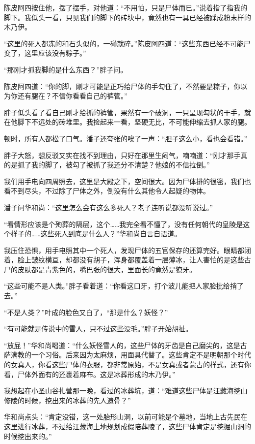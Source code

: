 陈皮阿四按住他，摆了摆手，对他道：“不用怕，只是尸体而已。”说着指了指我的脚下。我低头一看，只见我们的脚下的砖块中，竟然也有一具已经被踩成粉末样的木乃伊。

“这里的死人都冻的和石头似的，一碰就碎。”陈皮阿四道：“这些东西已经不可能尸变了，这里应该没有粽子。”

“那刚才抓我脚的是什么东西？”胖子问。

陈皮阿四道：“你的脚，刚才可能是正巧给尸体的手勾住了，不然要是粽子，你以为你还有腿在？不信你看看自己的裤管。”

胖子低头看了看自己刚才给抓的裤管，果然有一个破洞，一只呈现勾状的干手，就在他脚下不远处的砖堆里。我捡起来一看，坚硬无比，不可能伸缩去抓人家的腿。

顿时，所有人都松了口气。潘子还夸张的唉了一声：“胆子这么小，看也会看错。”

胖子大怒，想反驳又实在找不到理由，只好在那里生闷气，喃喃道：“刚才那手真的是抓了我的脚了，被勾了被抓了我还分不清楚？他娘的不信拉倒。”

我们用手电向四周照去，这里是大殿之下，空间很大。因为尸体排的很密，我们也看不到尽头，不过除了尸体之外，倒没有什么其他令人起疑的物体。

潘子问华和尚：“这里怎么会有这么多死人？老子连听说都没听说过。”

“看情形应该是个殉葬的隔层，这个……我完全看不懂了，没有任何朝代的皇陵是这个样子的……这些死人到底是什么人？”华和尚自言自语道。

我压住恐惧，用手电照其中一个死人，发现尸体的五官保存的还算完好。眼睛都闭着，脸上皱纹横亘，却都没有胡子，浑身都覆盖着一层薄冰，让人害怕的是这些古尸的皮肤都是青紫色的，嘴巴张的很大，里面长的竟然是獠牙。

“这些可能不是人类。”胖子看着道：“你看这口牙，打个波儿能把人家脸批给捎了去。”

“不是人类？”叶成的脸色又白了，“那是什么？妖怪？”

“有可能就是传说中的雪人，只不过这些没毛。”胖子开始胡扯。

“放屁！”华和尚喝道：“什么妖怪雪人的，这些尸体的牙齿是自己磨尖的，这是古萨满教的一个习俗。后来因为太麻烦，用面具代替了。这些肯定不是明朝那个时代的女真人，你看这些尸体的衣服，都非常原始，不是女真或者蒙古的样式，还有你看，尸体外面有的还裹着麻布。这是冰葬形成的木乃伊。”

我想起在小圣山谷扎营那一晚，看过的冰葬坑，道：“难道这些尸体是汪藏海挖山修陵的时候，挖出来的冰葬的先人遗骨？”

华和尚点头：“肯定没错，这一处胎形山洞，以前可能是个墓地，当地上古先民在这里进行冰葬，不过给汪藏海土地规划成假陪葬陵了，这些尸体肯定是挖掘山洞的时候挖出来的。”

